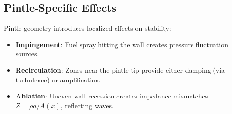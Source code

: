 \subsection{Pintle-Specific Effects}
Pintle geometry introduces localized effects on stability:
\begin{itemize}
    \item \textbf{Impingement}: Fuel spray hitting the wall creates pressure fluctuation sources.
    \item \textbf{Recirculation}: Zones near the pintle tip provide either damping (via turbulence) or amplification.
    \item \textbf{Ablation}: Uneven wall recession creates impedance mismatches \(Z = \rho a / A(x)\), reflecting waves.
\end{itemize}

